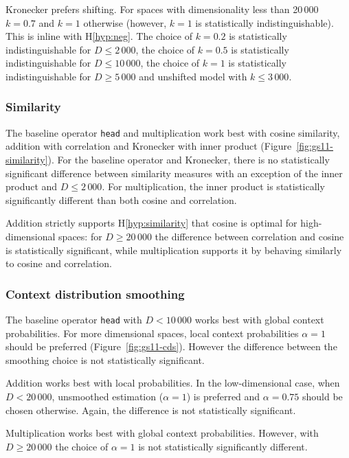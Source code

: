 Kronecker prefers shifting. For spaces with dimensionality less than 20\,000 $k = 0.7$ and $k = 1$ otherwise (however, $k=1$ is statistically indistinguishable). This is inline with H\ref{hyp:neg}. The choice of $k=0.2$ is statistically indistinguishable for $D \le 2\,000$, the choice of $k=0.5$ is statistically indistinguishable for $D \le 10\,000$, the choice of $k=1$ is statistically indistinguishable for $D \ge 5\,000$ and unshifted model with $k \le 3\,000$.



\subsubsection{Similarity}

The baseline operator \texttt{head} and multiplication work best with cosine similarity, addition with correlation and Kronecker with inner product (Figure~\ref{fig:gs11-similarity}). For the baseline operator and Kronecker, there is no statistically significant difference between similarity measures with an exception of the inner product and $D \le 2\,000$. For multiplication, the inner product is statistically significantly different than both cosine and correlation.

Addition strictly supports H\ref{hyp:similarity} that cosine is optimal for high-dimensional spaces: for $D \ge 20\,000$ the difference between correlation and cosine is statistically significant, while multiplication supports it by behaving similarly to cosine and correlation.

\subsubsection{Context distribution smoothing}

The baseline operator \texttt{head} with $D < 10\,000$ works best with global context probabilities. For more dimensional spaces, local context probabilities $\alpha = 1$ should be preferred (Figure~\ref{fig:gs11-cds}). However the difference between the smoothing choice is not statistically significant.

Addition works best with local probabilities. In the low-dimensional case, when $D < 20\,000$, unsmoothed estimation ($\alpha = 1$) is preferred and $\alpha = 0.75$ should be chosen otherwise. Again, the difference is not statistically significant.

Multiplication works best with global context probabilities. However, with $D \ge 20\,000$ the choice of $\alpha = 1$ is not statistically significantly different.

